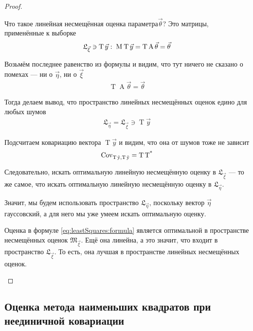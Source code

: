 \begin{proof}
\begin{enumerate}
      Что такое линейная несмещённая оценка параметра$\vec{\theta}$?
      Это матрицы, применённые к выборке
      \begin{align*}
          \mathfrak{L}_{\vec{\xi}} \ni \operatorname{T} \vec{y}:\;
          \operatorname{M}_{} \operatorname{T} \vec{y}
          = \operatorname{T} \operatorname{A} \vec{\theta}
          = \vec{\theta}
      \end{align*}

      Возьмём последнее равенство из формулы и видим, что тут ничего не
      сказано о помехах --- ни о $\vec{\eta}$, ни о $\vec{\xi}$
      \begin{align*}
          \operatorname{T} \operatorname{A} \vec{\theta}
          = \vec{\theta}
      \end{align*}

      Тогда делаем вывод, что пространство линейных несмещённых оценок
      едино для любых шумов
      \begin{align*}
          \mathfrak{L}_{\vec{\eta}}
          = \mathfrak{L}_{\vec{\xi}}
          \ni \operatorname{T} \vec{y}
      \end{align*}

      Подсчитаем ковариацию вектора $\operatorname{T} \vec{y}$ и видим,
      что она от шумов тоже не зависит
      \begin{align*}
          \operatorname{Cov^{}_{\operatorname{T} \vec{y}, \operatorname{T} \vec{y}}}
          = \operatorname{T} \operatorname{T^*}
      \end{align*}

      Следовательно, искать оптимальную линейную несмещённую оценку в
      $\mathfrak{L}_{\vec{\xi}}$ --- то же самое, что искать оптимальную
      линейную несмещённую оценку в $\mathfrak{L}_{\vec{\eta}}$.

      Значит, мы будем использовать пространство
      $\mathfrak{L}_{\vec{\eta}}$, поскольку вектор $\vec{\eta}$
      гауссовский, а для него мы уже умеем искать оптимальную оценку.

      Оценка в формуле \eqref{eq:leastSquares:formula} является
      оптимальной в пространстве несмещённых оценок
      $\mathfrak{M}_{\vec{\xi}}$. Ещё она линейна, а это значит, что
      входит в пространство $\mathfrak{L}_{\vec{\xi}}$.
      То есть, она лучшая в пространстве линейных несмещённых оценок.
  \end{enumerate}
\end{proof}
\subsection{Оценка метода наименьших квадратов при неединичной ковариации}

